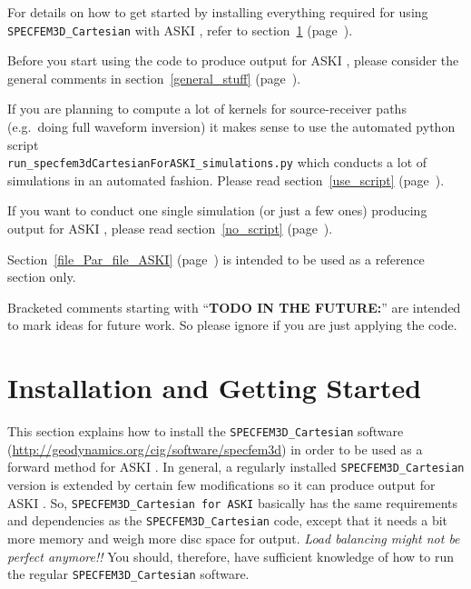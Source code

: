\documentclass[12pt,a4paper]{article}
\newcommand{\lcode}[1]{\nolinkurl{#1}}
\newcommand{\ASKI}{ {\ttfamily ASKI} }
\newcommand{\myref}[1]{\ref{#1} (page~\pageref{#1})}
\begin{document}
For details on how to get started by installing everything required for using \lcode{SPECFEM3D_Cartesian} 
with \ASKI{}, refer to section~\myref{install}{}. 

Before you start using the code to produce output for \ASKI{}, please consider the general
comments in section~\myref{general_stuff}.

If you are planning to compute a lot of kernels for source-receiver paths (e.g.\ doing full waveform inversion) 
it makes sense to use the automated python script \\ \lcode{run_specfem3dCartesianForASKI_simulations.py} 
which conducts a lot of simulations in an automated fashion. Please read section~\myref{use_script}. 

If you want to conduct one single simulation (or just a few ones) producing output for \ASKI{}, please 
read section~\myref{no_script}.

Section~\myref{file_Par_file_ASKI} is intended to be used as a reference section only.

Bracketed comments starting with ``{\bf TODO IN THE FUTURE:}'' are intended to mark ideas for future work. 
So please ignore if you are just applying the code.
%
\newpage
\tableofcontents
\newpage
%
\section{Installation and Getting Started} \label{install}
%
This section explains how to install the \lcode{SPECFEM3D_Cartesian} software 
(\url{http://geodynamics.org/cig/software/specfem3d})
in order to be used as a forward method for \ASKI{}. 
In general, a regularly installed \lcode{SPECFEM3D_Cartesian} version is extended by certain few modifications 
so it can produce output for \ASKI{}. So, \lcode{SPECFEM3D_Cartesian for ASKI} basically has the same requirements 
and dependencies as the \lcode{SPECFEM3D_Cartesian} code, except that it needs a bit more memory and weigh more 
disc space for output. \emph{Load balancing might not be perfect anymore!!} You should, therefore, have sufficient 
knowledge of how to run the regular \lcode{SPECFEM3D_Cartesian} software. 

\end{document}
